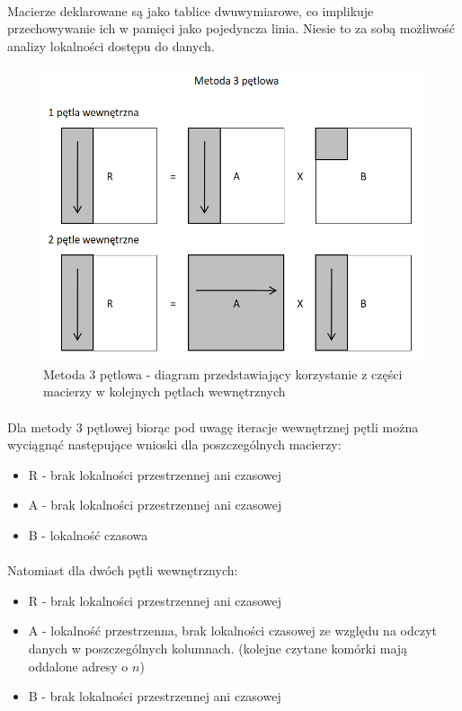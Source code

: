 \documentclass{scrartcl}
\begin{document}
\paragraph{}Macierze deklarowane są jako tablice dwuwymiarowe, co implikuje przechowywanie ich w pamięci jako pojedyncza linia. Niesie to za sobą możliwość analizy lokalności dostępu do danych.
\begin{figure}[H]
\includegraphics[width=\textwidth]{3petlowa.png}
\caption{Metoda 3 pętlowa - diagram przedstawiający korzystanie z części macierzy w kolejnych pętlach wewnętrznych}
\end{figure}
\paragraph{}Dla metody 3 pętlowej biorąc pod uwagę iteracje wewnętrznej pętli można wyciągnąć następujące wnioski dla poszczególnych macierzy: \\
\begin{itemize}
\item R - brak lokalności przestrzennej ani czasowej
\item A - brak lokalności przestrzennej ani czasowej
\item B - lokalność czasowa
\end{itemize}
\paragraph{}Natomiast dla dwóch pętli wewnętrznych:
\begin{itemize}
\item R - brak lokalności przestrzennej ani czasowej
\item A - lokalność przestrzenna, brak lokalności czasowej ze względu na odczyt danych w poszczególnych kolumnach. (kolejne czytane komórki mają oddalone adresy o $n$)
\item B - brak lokalności przestrzennej ani czasowej
\end{itemize}
\end{document}
